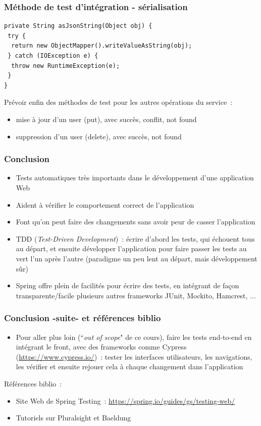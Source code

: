 \documentclass{beamer}
\begin{document}
\begin{frame}[fragile,label={obj2json}]
	\frametitle{Méthode de test d'intégration - sérialisation}
\begin{lstlisting}
private String asJsonString(Object obj) {
 try {
  return new ObjectMapper().writeValueAsString(obj);
 } catch (IOException e) {
  throw new RuntimeException(e);
 }
}
\end{lstlisting}
Prévoir enfin des méthodes de test pour les autres opérations du service~:
\begin{itemize}
	\item mise à jour d'un user (put), avec succès, conflit, not found
	\item suppression d'un user (delete), avec succès, not found
\end{itemize}

\end{frame}

\begin{frame}
	\frametitle{Conclusion}
	\begin{itemize}
		\item Tests automatiques très importants dans le développement d'une application Web
		\item Aident à vérifier le comportement correct de l'application
		\item Font qu'on peut faire des changements sans avoir peur de casser l'application
		\item TDD (\textit{Test-Driven Development})~: écrire d'abord les tests, qui échouent tous au départ, et ensuite développer l'application pour faire passer les tests au vert l'un après l'autre (paradigme un peu lent au départ, mais développement sûr)
		\item Spring offre plein de facilités pour écrire des tests, en intégrant de façon transparente/facile plusieurs autres frameworks JUnit, Mockito, Hamcrest, ...
	\end{itemize}
\end{frame} 

\begin{frame}
	\frametitle{Conclusion -suite- et références biblio}
	\begin{itemize}
		\item Pour aller plus loin (``\textit{out of scope}" de ce cours), faire les tests end-to-end en intégrant le front, avec des frameworks comme Cypress (\url{https://www.cypress.io/})~: tester les interfaces utilisateurs, les navigations, les vérifier et ensuite rejouer cela à chaque changement dans l'application
	\end{itemize}
	Références biblio~:
	\begin{itemize}
		\item Site Web de Spring Testing~: \url{https://spring.io/guides/gs/testing-web/}
		\item Tutoriels sur Pluralsight et Baeldung
	\end{itemize}
\end{frame} 
\end{document}
